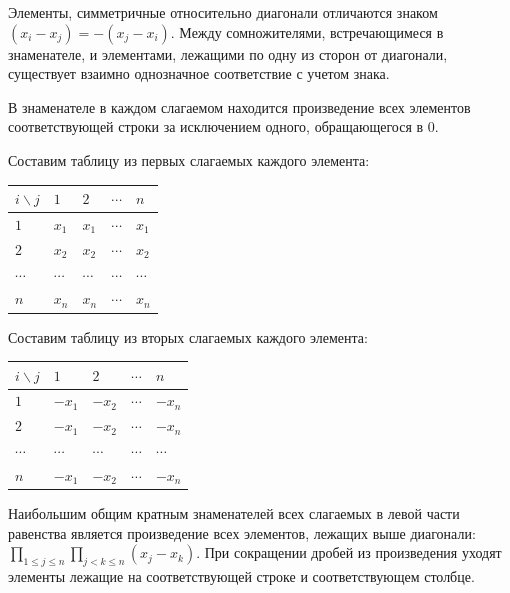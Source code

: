 \documentclass{book}
\begin{document}
Элементы, симметричные относительно диагонали отличаются знаком $(x_i-x_j)=-(x_j-x_i)$. Между сомножителями, встречающимеся в знаменателе, и элементами, лежащими по одну из сторон от диагонали, существует взаимно однозначное соответствие с учетом знака.

В знаменателе в каждом слагаемом находится произведение всех элементов соответствующей строки за исключением одного, обращающегося в $0$.

Составим таблицу из первых слагаемых каждого элемента:

\begin{tabularx}{0.8\textwidth} { 
  | >{\raggedright\arraybackslash}X 
  | >{\centering\arraybackslash}X
  | >{\centering\arraybackslash}X
  | >{\centering\arraybackslash}X
  | >{\centering\arraybackslash}X | }
 \hline  $i\backslash j$ & $1$   & $2$  & $\cdots$  & $n$   \\
 \hline  $1$ & $x_1$ & $x_1$& $\cdots$& $x_1$ \\
 \hline  $2$ & $x_2$ & $x_2$& $\cdots$& $x_2$ \\
 \hline  $\cdots$ & $\cdots$ & $\cdots$& $\cdots$& $\cdots$ \\
 \hline  $n$ & $x_n$ & $x_n$& $\cdots$& $x_n$ \\
 \hline
\end{tabularx}

Составим таблицу из вторых слагаемых каждого элемента:

\begin{tabularx}{0.8\textwidth} { 
  | >{\raggedright\arraybackslash}X 
  | >{\centering\arraybackslash}X
  | >{\centering\arraybackslash}X
  | >{\centering\arraybackslash}X
  | >{\centering\arraybackslash}X | }
 \hline  $i\backslash j$ & $1$   & $2$  & $\cdots$  & $n$   \\
 \hline  $1$ & $-x_1$ & $-x_2$& $\cdots$& $-x_n$ \\
 \hline  $2$ & $-x_1$ & $-x_2$& $\cdots$& $-x_n$ \\
 \hline  $\cdots$ & $\cdots$ & $\cdots$& $\cdots$& $\cdots$ \\
 \hline  $n$ & $-x_1$ & $-x_2$& $\cdots$& $-x_n$ \\
 \hline
\end{tabularx}

Наибольшим общим кратным знаменателей всех слагаемых в левой части равенства является произведение всех элементов, лежащих выше диагонали: $\prod_{1\leq j\leq n}{\prod_{j<k\leq n}{(x_j-x_k)}}$. При сокращении дробей из произведения уходят элементы лежащие на соответствующей строке и соответствующем столбце.
\end{document}
